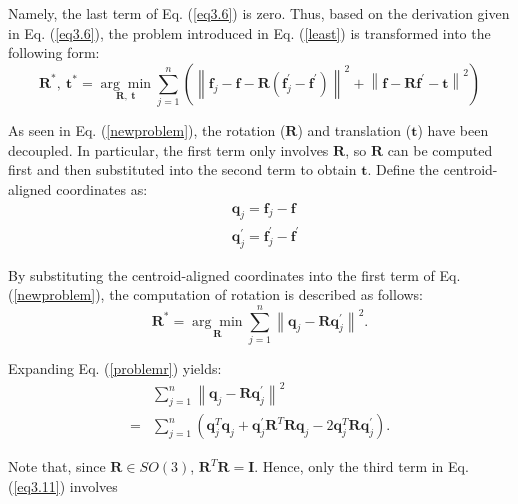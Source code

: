 Namely, the last term of Eq. (\ref{eq3.6}) is zero. Thus, based on the derivation given in Eq. (\ref{eq3.6}), the problem introduced in Eq. (\ref{least}) is transformed into the following form:
\begin{equation}	
	\mathbf{R}^{*},\  \mathbf{t}^{*}=\underset{\mathbf{R},\  \mathbf{t}}{\arg \min } \sum_{j=1}^{n}\left(
  \left\| \mathbf{f}_{j} - \mathbf{f} -\mathbf{R}\left(\mathbf{f}_{j}^{\prime}-\mathbf{f}^{\prime}\right) \right\|^{2} +  \left\|\mathbf{f}- \mathbf{R}\mathbf{f}^{\prime}-\mathbf{t} \right\|^{2}\right) \label{newproblem}
\end{equation}\par
As seen in Eq. (\ref{newproblem}), the rotation ($\mathbf{R}$) and translation ($\mathbf{t}$) have been decoupled. In particular, the first term only involves $\mathbf{R}$, so $\mathbf{R}$ can be computed first and then substituted into the second term to obtain $\mathbf{t}$. Define the centroid-aligned coordinates as:
\begin{equation}
\begin{aligned}
&\mathbf{q}_{j} = \mathbf{f}_{j} - \mathbf{f} \\
&\mathbf{q}^{\prime}_{j} = \mathbf{f}_{j}^{\prime}-\mathbf{f}^{\prime}
\end{aligned}
\end{equation}
\par
By substituting the centroid-aligned coordinates into the first term of Eq. (\ref{newproblem}), the computation of rotation is described as follows:
\begin{equation}	
	\mathbf{R}^{*}=\underset{\mathbf{R}}{\arg \min } \sum_{j=1}^{n}\left\|\mathbf{q}_{j}-\mathbf{R} \mathbf{q}_{j}^{\prime}\right\|^{2}. \label{problemr}
\end{equation} \par
Expanding Eq. (\ref{problemr}) yields:
\begin{equation}
\begin{aligned}
    &\sum_{j=1}^{n}\left\|\mathbf{q}_{j}-\mathbf{R} \mathbf{q}_{j}^{\prime}\right\|^{2} \\ 
=&\sum_{j=1}^{n}\left(\mathbf{q}_{j}^{T}\mathbf{q}_{j}+\mathbf{q}_{j}^{\prime}\mathbf{R}^{T}\mathbf{R}\mathbf{q}_{j}-2\mathbf{q}_{j}^{T}\mathbf{R}\mathbf{q}_{j}^{\prime}\right). \label{eq3.11}
 \end{aligned}
\end{equation} \par
Note that, since $\mathbf{R}\in SO(3)$, $\mathbf{R}^{T}\mathbf{R}= \mathbf{I}$. Hence, only the third term in Eq. (\ref{eq3.11}) involves 
